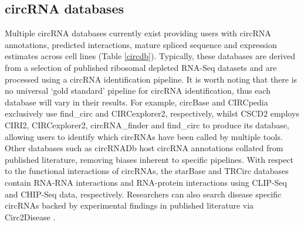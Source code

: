 \subsection{circRNA databases}
Multiple circRNA databases currently exist providing users with circRNA annotations, predicted interactions, mature spliced sequence and expression estimates across cell lines (Table \ref{circdb}). Typically, these databases are derived from a selection of published ribosomal depleted RNA-Seq datasets \cite{findcirc,Salzman2012,Jeck2012Dec,Salzman2014Jun,Ivanov2015Jan,Rybak-Wolf2015Jun,Ashwal-Fluss2014Oct,Maass2017Nov} and are processed using a circRNA identification pipeline. It is worth noting that there is no universal `gold standard' pipeline for circRNA identification, thus each database will vary in their results. For example, circBase \cite{circbase} and CIRCpedia exclusively use find\_circ and CIRCexplorer2, respectively, whilst CSCD2 \cite{CSCD2} employs CIRI2, CIRCexplorer2, circRNA\_finder and find\_circ to produce its database, allowing users to identify which circRNAs have been called by multiple tools. Other databases such as circRNADb \cite{circrnadb} host circRNA annotations collated from published literature, removing biases inherent to specific pipelines. With respect to the functional interactions of circRNAs, the starBase \cite{starbase} and TRCirc \cite{TRCirc} databases contain RNA-RNA interactions and RNA-protein interactions using CLIP-Seq and CHIP-Seq data, respectively. Researchers can also search disease specific circRNAs backed by experimental findings in published literature via Circ2Disease \cite{circ2disease}. \par
